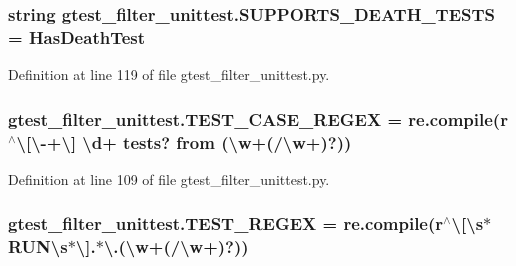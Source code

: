 \subsubsection[{\texorpdfstring{S\+U\+P\+P\+O\+R\+T\+S\+\_\+\+D\+E\+A\+T\+H\+\_\+\+T\+E\+S\+TS}{SUPPORTS_DEATH_TESTS}}]{\setlength{\rightskip}{0pt plus 5cm}string gtest\+\_\+filter\+\_\+unittest.\+S\+U\+P\+P\+O\+R\+T\+S\+\_\+\+D\+E\+A\+T\+H\+\_\+\+T\+E\+S\+TS = \textquotesingle{}Has\+Death\+Test\textquotesingle{}}\hypertarget{namespacegtest__filter__unittest_a660f467579ec78f8f856b588c6f6f270}{}\label{namespacegtest__filter__unittest_a660f467579ec78f8f856b588c6f6f270}


Definition at line 119 of file gtest\+\_\+filter\+\_\+unittest.\+py.

\subsubsection[{\texorpdfstring{T\+E\+S\+T\+\_\+\+C\+A\+S\+E\+\_\+\+R\+E\+G\+EX}{TEST_CASE_REGEX}}]{\setlength{\rightskip}{0pt plus 5cm}gtest\+\_\+filter\+\_\+unittest.\+T\+E\+S\+T\+\_\+\+C\+A\+S\+E\+\_\+\+R\+E\+G\+EX = re.\+compile(r\textquotesingle{}$^\wedge$\textbackslash{}\mbox{[}\textbackslash{}-\/+\textbackslash{}\mbox{]} \textbackslash{}d+ tests? from (\textbackslash{}w+(/\textbackslash{}w+)?)\textquotesingle{})}\hypertarget{namespacegtest__filter__unittest_a76b555691fb57191f50a4328134fb4d8}{}\label{namespacegtest__filter__unittest_a76b555691fb57191f50a4328134fb4d8}


Definition at line 109 of file gtest\+\_\+filter\+\_\+unittest.\+py.

\subsubsection[{\texorpdfstring{T\+E\+S\+T\+\_\+\+R\+E\+G\+EX}{TEST_REGEX}}]{\setlength{\rightskip}{0pt plus 5cm}gtest\+\_\+filter\+\_\+unittest.\+T\+E\+S\+T\+\_\+\+R\+E\+G\+EX = re.\+compile(r\textquotesingle{}$^\wedge$\textbackslash{}\mbox{[}\textbackslash{}s$\ast$R\+U\+N\textbackslash{}s$\ast$\textbackslash{}\mbox{]}.$\ast$\textbackslash{}.(\textbackslash{}w+(/\textbackslash{}w+)?)\textquotesingle{})}\hypertarget{namespacegtest__filter__unittest_a9327e0f4c9fab06a346228cc5bab53f2}{}\label{namespacegtest__filter__unittest_a9327e0f4c9fab06a346228cc5bab53f2}


